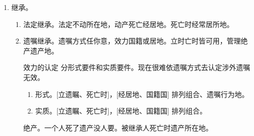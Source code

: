 \begin{enumerate}
\begin{enumerate}
\begin{enumerate}
                  \item 收养条件、程序。收养人和被收养人经居地。。
                \end{enumerate}
          \item 效力。收养效力收养居。收养时收养人经居地。
          \item 解除。解除被收法院地。收养时被收养人经居地 \hz 法院地。
        \end{enumerate}
  \item 继承。
        \begin{enumerate}
          \item 法定继承。法定不动所在地，动产死亡经居地。死亡时经常居所地。
          \item 遗嘱继承。遗嘱方式任你意，效力国籍或居地。立时亡时皆可用，管理绝产遗产地。
                \begin{kk}{效力的认定}
                  分形式要件和实质要件。现在很难依遗嘱方式去认定涉外遗嘱无效。
                  \begin{enumerate}
                    \item 形式。[立遗瞩、死亡时]，[经居地、国籍国] 排列组合、遗嘱行为地。
                    \item 实质。[立遗瞩、死亡时]，[经居地、国籍国] 排列组合。
                  \end{enumerate}
                  \tcblower
                  绝产。一个人死了遗产没人要。被继承人死亡时遗产所在地。
                \end{kk}
        \end{enumerate}
\end{enumerate}
